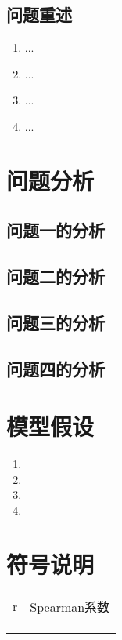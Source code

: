 \documentclass[a4paper]{article}
\begin{document}
	\subsection{问题重述}
	\begin{enumerate}[itemindent=0.5cm]
		\item ...
		\item ...
		\item ...
		\item ...
	\end{enumerate}
	
	\section{问题分析}
	\subsection{问题一的分析}
	\subsection{问题二的分析}
	\subsection{问题三的分析}
	\subsection{问题四的分析}
	
	\section{模型假设}
	\begin{enumerate} 
		\item 
		\item 
		\item 
		\item 
	\end{enumerate}
	
	\section{符号说明}
	\begin{table}[H] %
		\captionsetup{skip=4pt} %
		\centering
		\setlength{\arrayrulewidth}{2pt} %
		\begin{tabular}{cc} %
			\hline
			\makebox[0.15\textwidth][c]{符号} & \makebox[0.6\textwidth][c]{说明}  \\ 
			\hline
			r & Spearman系数  \\
			&   \\
			&   \\
			&   \\
			\hline
		\end{tabular}
	\end{table}
	
\end{document}
